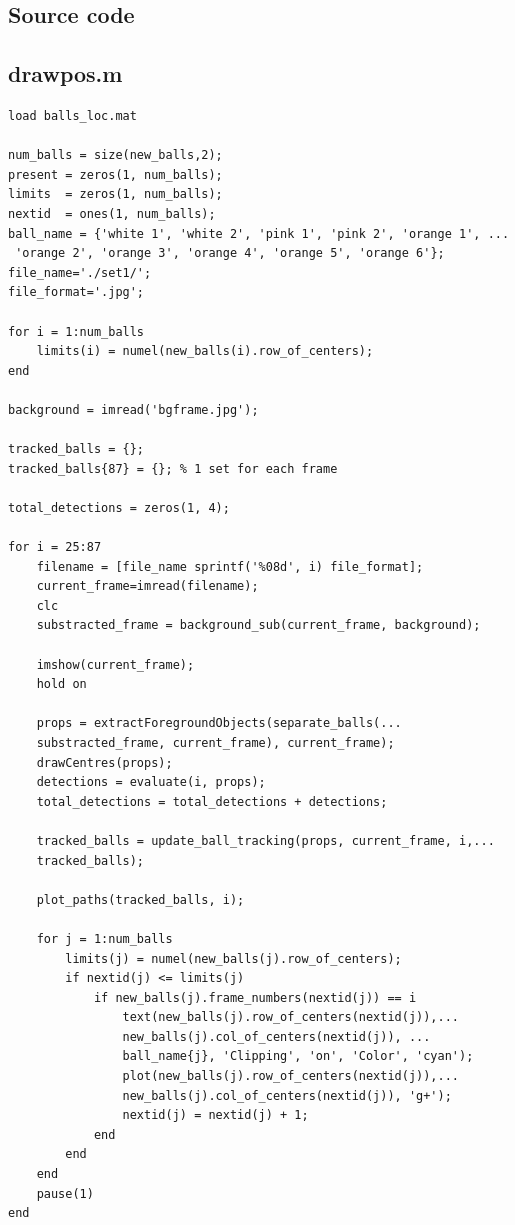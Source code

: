 \documentclass[12pt,a4paper]{article}
\begin{document}
\begin{appendices}
\section{Source code}

\subsection{drawpos.m}
\begin{verbatim}
load balls_loc.mat

num_balls = size(new_balls,2);
present = zeros(1, num_balls);
limits  = zeros(1, num_balls);
nextid  = ones(1, num_balls);
ball_name = {'white 1', 'white 2', 'pink 1', 'pink 2', 'orange 1', ...
 'orange 2', 'orange 3', 'orange 4', 'orange 5', 'orange 6'};
file_name='./set1/';
file_format='.jpg';

for i = 1:num_balls
	limits(i) = numel(new_balls(i).row_of_centers);
end

background = imread('bgframe.jpg');

tracked_balls = {};
tracked_balls{87} = {}; % 1 set for each frame

total_detections = zeros(1, 4);

for i = 25:87
	filename = [file_name sprintf('%08d', i) file_format];
	current_frame=imread(filename);
	clc
    substracted_frame = background_sub(current_frame, background);
    
    imshow(current_frame);
    hold on
       
    props = extractForegroundObjects(separate_balls(...
    substracted_frame, current_frame), current_frame);
    drawCentres(props);
    detections = evaluate(i, props);
    total_detections = total_detections + detections;
    
    tracked_balls = update_ball_tracking(props, current_frame, i,...
    tracked_balls);
    
    plot_paths(tracked_balls, i);
    
	for j = 1:num_balls
		limits(j) = numel(new_balls(j).row_of_centers);
		if nextid(j) <= limits(j)
			if new_balls(j).frame_numbers(nextid(j)) == i
				text(new_balls(j).row_of_centers(nextid(j)),...
				new_balls(j).col_of_centers(nextid(j)), ...
				ball_name{j}, 'Clipping', 'on', 'Color', 'cyan');
				plot(new_balls(j).row_of_centers(nextid(j)),...
				new_balls(j).col_of_centers(nextid(j)), 'g+');
				nextid(j) = nextid(j) + 1;
			end
        end
    end
	pause(1)
end


\end{verbatim}
\end{appendices}
\end{document}
